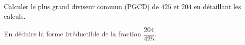 \begin{myenumerate}
\item Calculer le plus grand diviseur commun (PGCD) de $425$ et $204$ en détaillant les calculs.
\item En déduire la forme irréductible de la fraction $\dfrac{204}{425}$. 
\end{myenumerate}
